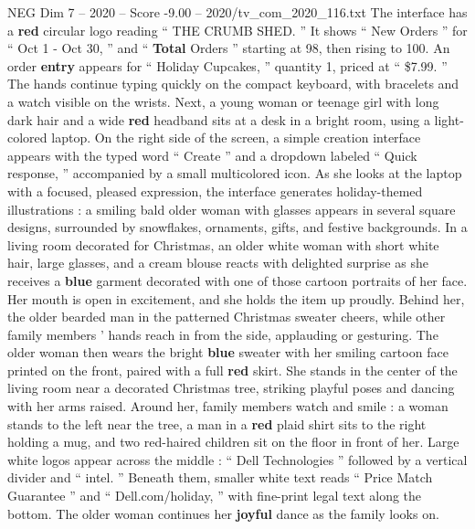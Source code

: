 \begin{textsample}{NEG Dim 7 – 2020 – Score -9.00 – 2020/tv\_com\_2020\_116.txt}
The interface has a \textbf{red} circular logo reading “ THE CRUMB SHED. ” It shows “ New Orders ” for “ Oct 1 - Oct 30, ” and “ \textbf{Total} Orders ” starting at 98, then rising to 100.
An order \textbf{entry} appears for “ Holiday Cupcakes, ” quantity 1, priced at “ \$7.99. ” The hands continue typing quickly on the compact keyboard, with bracelets and a watch visible on the wrists.
Next, a young woman or teenage girl with long dark hair and a wide \textbf{red} headband sits at a desk in a bright room, using a light-colored laptop.
On the right side of the screen, a simple creation interface appears with the typed word “ Create ” and a dropdown labeled “ Quick response, ” accompanied by a small multicolored icon.
As she looks at the laptop with a focused, pleased expression, the interface generates holiday-themed illustrations : a smiling bald older woman with glasses appears in several square designs, surrounded by snowflakes, ornaments, gifts, and festive backgrounds.
In a living room decorated for Christmas, an older white woman with short white hair, large glasses, and a cream blouse reacts with delighted surprise as she receives a \textbf{blue} garment decorated with one of those cartoon portraits of her face.
Her mouth is open in excitement, and she holds the item up proudly.
Behind her, the older bearded man in the patterned Christmas sweater cheers, while other family members ’ hands reach in from the side, applauding or gesturing.
The older woman then wears the bright \textbf{blue} sweater with her smiling cartoon face printed on the front, paired with a full \textbf{red} skirt.
She stands in the center of the living room near a decorated Christmas tree, striking playful poses and dancing with her arms raised.
Around her, family members watch and smile : a woman stands to the left near the tree, a man in a \textbf{red} plaid shirt sits to the right holding a mug, and two red-haired children sit on the floor in front of her.
Large white logos appear across the middle : “ Dell Technologies ” followed by a vertical divider and “ intel. ” Beneath them, smaller white text reads “ Price Match Guarantee ” and “ Dell.com/holiday, ” with fine-print legal text along the bottom.
The older woman continues her \textbf{joyful} dance as the family looks on.

\end{textsample}
